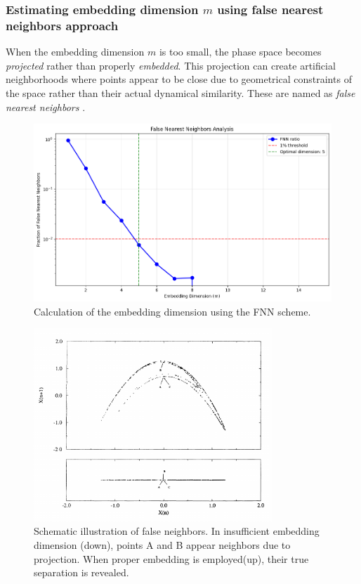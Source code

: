 \documentclass{article}
\begin{document}
			\subsubsection{Estimating embedding dimension \( m \) using false nearest neighbors approach}

			When the embedding dimension $m$ is too small, 
			the phase space becomes \emph{projected} rather than 
			properly \emph{embedded}. 
			This projection can create artificial neighborhoods where points appear to be close due to 
			geometrical constraints of the space rather than their actual dynamical similarity. 
			These are named as \emph{false nearest neighbors} \cite{kennel1992}.


				\begin{figure}[h!]
				    \centering
				    \includegraphics[width=0.8\linewidth]{fnn_estim.png}
				    \caption{Calculation of the embedding dimension using the FNN scheme.}
				    \label{fig:fnn_plot}
				\end{figure}


			\begin{figure}[h]
			\centering
			\includegraphics[width=0.8\textwidth]{fnn_schematic.png}
			\caption{Schematic illustration of false neighbors. In insufficient embedding dimension (down), points A and B appear neighbors due to projection. When proper embedding is employed(up), their true separation is revealed.}
			\label{fig:fnn_schematic}
			\end{figure}
\end{document}
